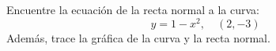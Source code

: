 \setcounter{enumi}{50}
\item Encuentre la ecuación de la recta normal a la curva:
$$y = 1 - x^2, \quad (2, -3)$$
Además, trace la gráfica de la curva y la recta normal.
